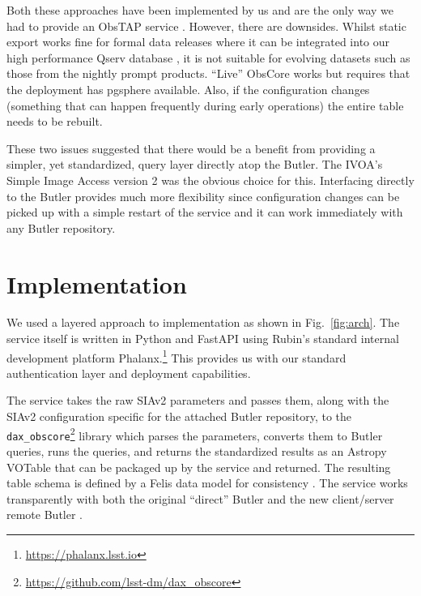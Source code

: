 \documentclass[11pt,twoside]{article}
\begin{document}
Both these approaches have been implemented by us and are the only way we had to provide an ObsTAP service \citep{2017ivoa.spec.0509L}.
However, there are downsides.
Whilst static export works fine for formal data releases where it can be integrated into our high performance Qserv database \citep{C15_adassxxxii}, it is not suitable for evolving datasets such as those from the nightly prompt products.
``Live'' ObsCore works but requires that the deployment has pgsphere available.
Also, if the configuration changes (something that can happen frequently during early operations) the entire table needs to be rebuilt.

These two issues suggested that there would be a benefit from providing a simpler, yet standardized, query layer directly atop the Butler.
The IVOA's Simple Image Access version 2 \citep[SIAv2;][]{2015ivoa.spec.1223D} was the obvious choice for this.
Interfacing directly to the Butler provides much more flexibility since configuration changes can be picked up with a simple restart of the service and it can work immediately with any Butler repository.

\section{Implementation}


We used a layered approach to implementation as shown in Fig.\ \ref{fig:arch}.
The service itself \citep{SQR-095} is written in Python and FastAPI using Rubin's standard internal development platform Phalanx.\footnote{\url{https://phalanx.lsst.io}}
This provides us with our standard authentication layer and deployment capabilities.

The service takes the raw SIAv2 parameters and passes them, along with the SIAv2 configuration specific for the attached Butler repository, to the \texttt{dax\_obscore}\footnote{\url{https://github.com/lsst-dm/dax_obscore}} library which parses the parameters, converts them to Butler queries, runs the queries, and returns the standardized results as an Astropy VOTable that can be packaged up by the service and returned.
The resulting table schema is defined by a Felis data model for consistency \citep{C702_adassxxxiv}.
The service works transparently with both the original ``direct'' Butler and the new client/server remote Butler \citep{2024SPIE13101E..3GJ}.
\end{document}
